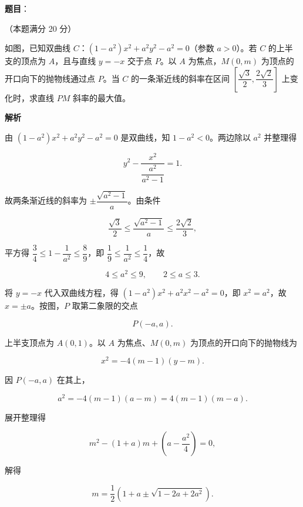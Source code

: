 \begin{answer}

\textbf{题目}：

（本题满分 20 分）

如图，已知双曲线 $C$：$(1-a^{2})x^{2}+a^{2}y^{2}-a^{2}=0$（参数 $a>0$）。若 $C$ 的上半支的顶点为 $A$，且与直线 $y=-x$ 交于点 $P$。以 $A$ 为焦点，$M(0,m)$ 为顶点的开口向下的抛物线通过点 $P$。当 $C$ 的一条渐近线的斜率在区间 $\left[\dfrac{\sqrt{3}}{2},\dfrac{2\sqrt{2}}{3}\right]$ 上变化时，求直线 $PM$ 斜率的最大值。
\nopagebreak[4]
\begin{center}\end{center}
\nopagebreak[4]
\textbf{解析}

由 $(1-a^{2})x^{2}+a^{2}y^{2}-a^{2}=0$ 是双曲线，知 $1-a^{2}<0$。两边除以 $a^{2}$ 并整理得

\nopagebreak[4]
\[
y^{2}-\frac{x^{2}}{\dfrac{a^{2}}{a^{2}-1}}=1.
\]

故两条渐近线的斜率为 $\pm\dfrac{\sqrt{a^{2}-1}}{a}$。由条件

\nopagebreak[4]
\[
\frac{\sqrt{3}}{2}\le\frac{\sqrt{a^{2}-1}}{a}\le\frac{2\sqrt{2}}{3},
\]

平方得 $\dfrac{3}{4}\le 1-\dfrac{1}{a^{2}}\le\dfrac{8}{9}$，即 $\dfrac{1}{9}\le\dfrac{1}{a^{2}}\le\dfrac{1}{4}$，故

\nopagebreak[4]
\[
4\le a^{2}\le 9,\qquad 2\le a\le 3.
\]

将 $y=-x$ 代入双曲线方程，得 $(1-a^{2})x^{2}+a^{2}x^{2}-a^{2}=0$，即 $x^{2}=a^{2}$，故 $x=\pm a$。按图，$P$ 取第二象限的交点

\nopagebreak[4]
\[
P(-a,a).
\]

上半支顶点为 $A(0,1)$。以 $A$ 为焦点、$M(0,m)$ 为顶点的开口向下的抛物线为

\nopagebreak[4]
\[
x^{2}=-4(m-1)(y-m).
\]

因 $P(-a,a)$ 在其上，

\nopagebreak[4]
\[
a^{2}=-4(m-1)(a-m)=4(m-1)(m-a). \tag{①}
\]

展开整理得

\nopagebreak[4]
\[
m^{2}-(1+a)m+\left(a-\frac{a^{2}}{4}\right)=0,
\]

解得

\nopagebreak[4]
\[
m=\frac{1}{2}\left(1+a\pm\sqrt{1-2a+2a^{2}}\right).
\]


\end{answer}
